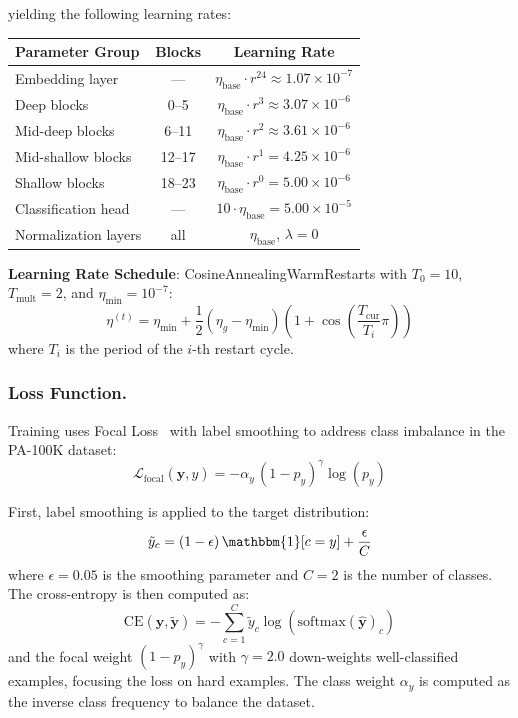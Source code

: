 \documentclass[11pt,a4paper]{article}
\newcommand{\softmax}{\mathrm{softmax}}
\begin{document}
\noindent yielding the following learning rates:
\begin{center}
\small
\begin{tabular}{lcc}
\toprule
\textbf{Parameter Group} & \textbf{Blocks} & \textbf{Learning Rate} \\
\midrule
Embedding layer & --- & $\eta_{\text{base}} \cdot r^{24} \approx 1.07 \times 10^{-7}$ \\
Deep blocks & 0--5 & $\eta_{\text{base}} \cdot r^3 \approx 3.07 \times 10^{-6}$ \\
Mid-deep blocks & 6--11 & $\eta_{\text{base}} \cdot r^2 \approx 3.61 \times 10^{-6}$ \\
Mid-shallow blocks & 12--17 & $\eta_{\text{base}} \cdot r^1 = 4.25 \times 10^{-6}$ \\
Shallow blocks & 18--23 & $\eta_{\text{base}} \cdot r^0 = 5.00 \times 10^{-6}$ \\
Classification head & --- & $10 \cdot \eta_{\text{base}} = 5.00 \times 10^{-5}$ \\
Normalization layers & all & $\eta_{\text{base}}$, $\lambda = 0$ \\
\bottomrule
\end{tabular}
\end{center}

\textbf{Learning Rate Schedule}: CosineAnnealingWarmRestarts with $T_0 = 10$, $T_{\text{mult}} = 2$, and $\eta_{\min} = 10^{-7}$:
\begin{equation}
\eta^{(t)} = \eta_{\min} + \frac{1}{2}(\eta_{g} - \eta_{\min})\left(1 + \cos\!\left(\frac{T_{\text{cur}}}{T_i}\pi\right)\right)
\end{equation}
where $T_i$ is the period of the $i$-th restart cycle.

\subsubsection{Loss Function.}
Training uses Focal Loss~\cite{focal_loss} with label smoothing to address class imbalance in the PA-100K dataset:
\begin{equation}
\mathcal{L}_{\text{focal}}(\hat{\mathbf{y}}, y) = -\alpha_y\,(1 - p_y)^\gamma \log(p_y)
\label{eq:focal}
\end{equation}

First, label smoothing is applied to the target distribution:
\begin{equation}
\tilde{y}_c = (1 - \epsilon)\,\mathbbm{1}[c = y] + \frac{\epsilon}{C}
\end{equation}
where $\epsilon = 0.05$ is the smoothing parameter and $C = 2$ is the number of classes. The cross-entropy is then computed as:
\begin{equation}
\text{CE}(\hat{\mathbf{y}}, \tilde{\mathbf{y}}) = -\sum_{c=1}^{C} \tilde{y}_c \log(\softmax(\hat{\mathbf{y}})_c)
\end{equation}
and the focal weight $(1 - p_y)^\gamma$ with $\gamma = 2.0$ down-weights well-classified examples, focusing the loss on hard examples. The class weight $\alpha_y$ is computed as the inverse class frequency to balance the dataset.
\end{document}
